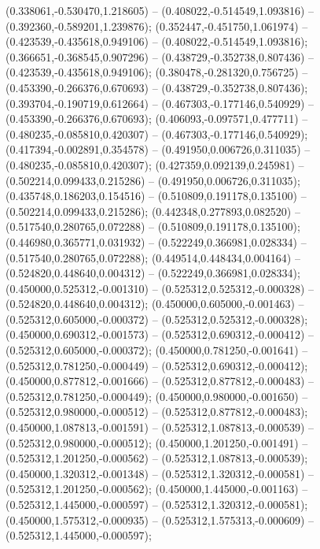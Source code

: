  (0.338061,-0.530470,1.218605) -- (0.408022,-0.514549,1.093816) -- (0.392360,-0.589201,1.239876);
 (0.352447,-0.451750,1.061974) -- (0.423539,-0.435618,0.949106) -- (0.408022,-0.514549,1.093816);
 (0.366651,-0.368545,0.907296) -- (0.438729,-0.352738,0.807436) -- (0.423539,-0.435618,0.949106);
 (0.380478,-0.281320,0.756725) -- (0.453390,-0.266376,0.670693) -- (0.438729,-0.352738,0.807436);
 (0.393704,-0.190719,0.612664) -- (0.467303,-0.177146,0.540929) -- (0.453390,-0.266376,0.670693);
 (0.406093,-0.097571,0.477711) -- (0.480235,-0.085810,0.420307) -- (0.467303,-0.177146,0.540929);
 (0.417394,-0.002891,0.354578) -- (0.491950,0.006726,0.311035) -- (0.480235,-0.085810,0.420307);
 (0.427359,0.092139,0.245981) -- (0.502214,0.099433,0.215286) -- (0.491950,0.006726,0.311035);
 (0.435748,0.186203,0.154516) -- (0.510809,0.191178,0.135100) -- (0.502214,0.099433,0.215286);
 (0.442348,0.277893,0.082520) -- (0.517540,0.280765,0.072288) -- (0.510809,0.191178,0.135100);
 (0.446980,0.365771,0.031932) -- (0.522249,0.366981,0.028334) -- (0.517540,0.280765,0.072288);
 (0.449514,0.448434,0.004164) -- (0.524820,0.448640,0.004312) -- (0.522249,0.366981,0.028334);
 (0.450000,0.525312,-0.001310) -- (0.525312,0.525312,-0.000328) -- (0.524820,0.448640,0.004312);
 (0.450000,0.605000,-0.001463) -- (0.525312,0.605000,-0.000372) -- (0.525312,0.525312,-0.000328);
 (0.450000,0.690312,-0.001573) -- (0.525312,0.690312,-0.000412) -- (0.525312,0.605000,-0.000372);
 (0.450000,0.781250,-0.001641) -- (0.525312,0.781250,-0.000449) -- (0.525312,0.690312,-0.000412);
 (0.450000,0.877812,-0.001666) -- (0.525312,0.877812,-0.000483) -- (0.525312,0.781250,-0.000449);
 (0.450000,0.980000,-0.001650) -- (0.525312,0.980000,-0.000512) -- (0.525312,0.877812,-0.000483);
 (0.450000,1.087813,-0.001591) -- (0.525312,1.087813,-0.000539) -- (0.525312,0.980000,-0.000512);
 (0.450000,1.201250,-0.001491) -- (0.525312,1.201250,-0.000562) -- (0.525312,1.087813,-0.000539);
 (0.450000,1.320312,-0.001348) -- (0.525312,1.320312,-0.000581) -- (0.525312,1.201250,-0.000562);
 (0.450000,1.445000,-0.001163) -- (0.525312,1.445000,-0.000597) -- (0.525312,1.320312,-0.000581);
 (0.450000,1.575312,-0.000935) -- (0.525312,1.575313,-0.000609) -- (0.525312,1.445000,-0.000597);
